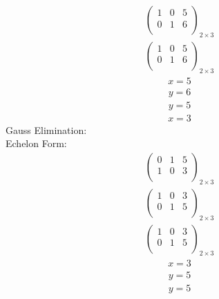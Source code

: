 \documentclass{article}
\begin{document}
\begin{align*}
\left(
\begin{array}{cc|c}
1 & 0 & 5\\
0 & 1 & 6\\
\end{array}
\right)_{2\times 3}
\end{align*}
\begin{align*}
\left(
\begin{array}{cc|c}
1 & 0 & 5\\
0 & 1 & 6\\
\end{array}
\right)_{2\times 3}
\end{align*}
\begin{align*}
x=5\end{align*}
\begin{align*}
y=6\end{align*}
\begin{align*}
y=5\end{align*}
\begin{align*}
x=3\end{align*}
Gauss Elimination:\\
Echelon Form:\\
\begin{align*}
\left(
\begin{array}{cc|c}
0 & 1 & 5\\
1 & 0 & 3\\
\end{array}
\right)_{2\times 3}
\end{align*}
\begin{align*}
\left(
\begin{array}{cc|c}
1 & 0 & 3\\
0 & 1 & 5\\
\end{array}
\right)_{2\times 3}
\end{align*}
\begin{align*}
\left(
\begin{array}{cc|c}
1 & 0 & 3\\
0 & 1 & 5\\
\end{array}
\right)_{2\times 3}
\end{align*}
\begin{align*}
x=3\end{align*}
\begin{align*}
y=5\end{align*}
\begin{align*}
y=5\end{align*}
\end{document}
